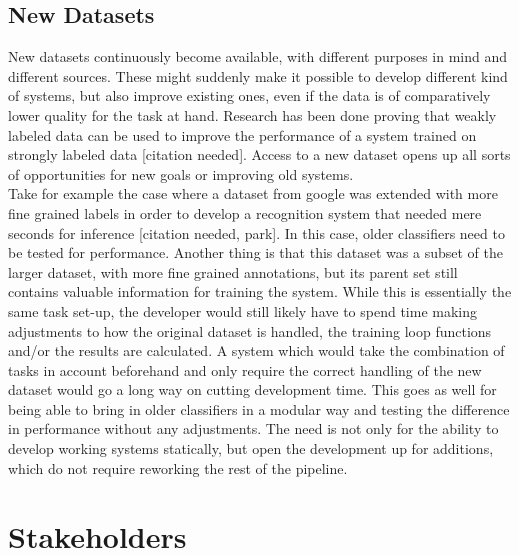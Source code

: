 \subsection{New Datasets}


New datasets continuously become available, with different purposes in mind and different sources. These might suddenly make it possible to develop different kind of systems, but also improve existing ones, even if the data is of comparatively lower quality for the task at hand. Research has been done proving that weakly labeled data can be used to improve the performance of a system trained on strongly labeled data [citation needed]. Access to a new dataset opens up all sorts of opportunities for new goals or improving old systems. \\

Take for example the case where a dataset from google was extended with more fine grained labels in order to develop a recognition system that needed mere seconds for inference [citation needed, park]. In this case, older classifiers need to be tested for performance. Another thing is that this dataset was a subset of the larger dataset, with more fine grained annotations, but its parent set still contains valuable information for training the system. While this is essentially the same task set-up, the developer would still likely have to spend time making adjustments to how the original dataset is handled, the training loop functions and/or the results are calculated. A system which would take the combination of tasks in account beforehand and only require the correct handling of the new dataset would go a long way on cutting development time. This goes as well for being able to bring in older classifiers in a modular way and testing the difference in performance without any adjustments. The need is not only for the ability to develop working systems statically, but open the development up for additions, which do not require reworking the rest of the pipeline.\\


\section{Stakeholders}


